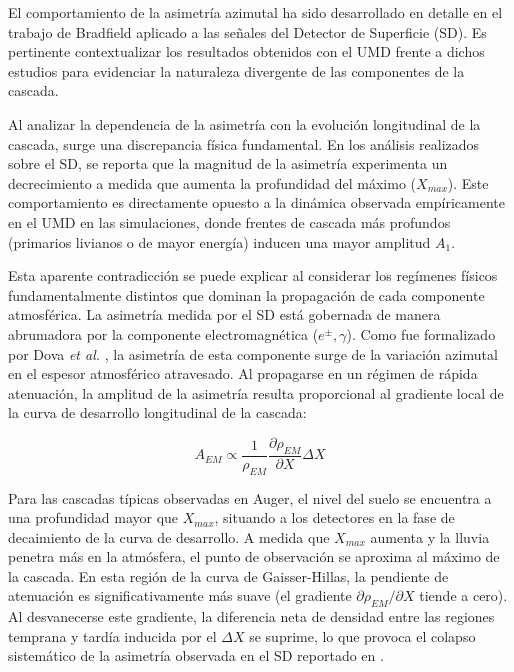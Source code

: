 El comportamiento de la asimetría azimutal ha sido desarrollado en detalle en el trabajo de Bradfield \cite{BradfieldThesis} aplicado a las señales del Detector de Superficie (SD). Es pertinente contextualizar los resultados obtenidos con el UMD frente a dichos estudios para evidenciar la naturaleza divergente de las componentes de la cascada.

Al analizar la dependencia de la asimetría con la evolución longitudinal de la cascada, surge una discrepancia física fundamental. En los análisis realizados sobre el SD, se reporta que la magnitud de la asimetría experimenta un decrecimiento a medida que aumenta la profundidad del máximo ($X_{max}$). Este comportamiento es directamente opuesto a la dinámica observada empíricamente en el UMD en las simulaciones, donde frentes de cascada más profundos (primarios livianos o de mayor energía) inducen una mayor amplitud $A_1$.

Esta aparente contradicción se puede explicar al considerar los regímenes físicos fundamentalmente distintos que dominan la propagación de cada componente atmosférica. La asimetría medida por el SD está gobernada de manera abrumadora por la componente electromagnética ($e^\pm, \gamma$). Como fue formalizado por Dova \textit{et al.} \cite{dova2003}, la asimetría de esta componente surge de la variación azimutal en el espesor atmosférico atravesado. Al propagarse en un régimen de rápida atenuación, la amplitud de la asimetría resulta proporcional al gradiente local de la curva de desarrollo longitudinal de la cascada:

\begin{equation}
	A_{EM} \propto \frac{1}{\rho_{EM}} \frac{\partial \rho_{EM}}{\partial X} \Delta X
	\label{eq:asym_em_taylor}
\end{equation}

Para las cascadas típicas observadas en Auger, el nivel del suelo se encuentra a una profundidad mayor que $X_{max}$, situando a los detectores en la fase de decaimiento de la curva de desarrollo. A medida que $X_{max}$ aumenta y la lluvia penetra más en la atmósfera, el punto de observación se aproxima al máximo de la cascada. En esta región de la curva de Gaisser-Hillas, la pendiente de atenuación es significativamente más suave (el gradiente $\partial \rho_{EM} / \partial X$ tiende a cero). Al desvanecerse este gradiente, la diferencia neta de densidad entre las regiones temprana y tardía inducida por el $\Delta X$ se suprime, lo que provoca el colapso sistemático de la asimetría observada en el SD reportado en \cite{BradfieldThesis}.

